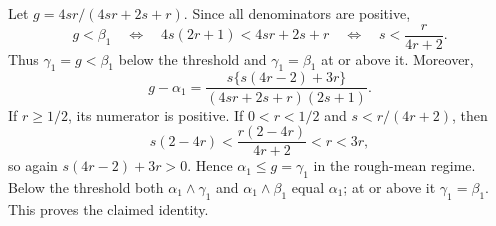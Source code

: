 Let \(g=4sr/(4sr+2s+r)\).  Since all denominators are positive,
\[
g<\beta_1
\quad\Longleftrightarrow\quad
4s(2r+1)<4sr+2s+r
\quad\Longleftrightarrow\quad
s<\frac{r}{4r+2}.
\]
Thus \(\gamma_1=g<\beta_1\) below the threshold and \(\gamma_1=\beta_1\) at or above it.  Moreover,
\[
g-\alpha_1
=\frac{s\{s(4r-2)+3r\}}{(4sr+2s+r)(2s+1)}.
\]
If \(r\geq1/2\), its numerator is positive.  If \(0<r<1/2\) and \(s<r/(4r+2)\), then
\[
s(2-4r)<\frac{r(2-4r)}{4r+2}<r<3r,
\]
so again \(s(4r-2)+3r>0\).  Hence \(\alpha_1\leq g=\gamma_1\) in the rough-mean regime.  Below the threshold both \(\alpha_1\wedge\gamma_1\) and \(\alpha_1\wedge\beta_1\) equal \(\alpha_1\); at or above it \(\gamma_1=\beta_1\).  This proves the claimed identity.